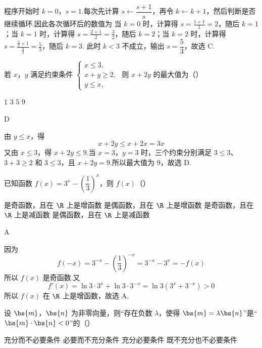 \begin{solution}
程序开始时 \(k=0\)，\(s=1\).每次先计算 \(s\leftarrow\dfrac{s+1}{s}\)，再令 \(k\leftarrow k+1\)，然后判断是否继续循环.因此各次循环后的数值为
当 \(k=0\) 时，计算得 \(s=\frac{1+1}{1}=2\)，随后 \(k=1\)；当 \(k=1\) 时，计算得 \(s=\frac{2+1}{2}=\frac32\)，随后 \(k=2\)；当 \(k=2\) 时，计算得 \(s=\frac{\frac32+1}{\frac32}=\frac53\)，随后 \(k=3\).
此时 \(k<3\) 不成立，输出 \(s=\dfrac53\)，故选 C.
\end{solution}

\begin{problem}
若 \(x\)，\(y\) 满足约束条件 \(\begin{cases}
x\le 3,\\
x+y\ge 2,\\
y\le x,
\end{cases}\) 则 \(x+2y\) 的最大值为（\quad）

\choices
    {\(1\)}
    {\(3\)}
    {\(5\)}
    {\(9\)}
\end{problem}

\begin{answer}
D
\end{answer}

\begin{solution}
由 \(y\le x\)，得
\[
x+2y\le x+2x=3x
\]
又由 \(x\le3\)，得 \(x+2y\le9\).当 \(x=3\)，\(y=3\) 时，三个约束分别满足 \(3\le3\)、\(3+3\ge2\) 和 \(3\le3\)，且 \(x+2y=9\).所以最大值为 \(9\)，故选 D.
\end{solution}

\begin{problem}
已知函数 \(f(x)=3^x-\left(\dfrac13\right)^x\)，则 \(f(x)\)（\quad）

\choices
    {是奇函数，且在 \(\R\) 上是增函数}
    {是偶函数，且在 \(\R\) 上是增函数}
    {是奇函数，且在 \(\R\) 上是减函数}
    {是偶函数，且在 \(\R\) 上是减函数}
\end{problem}

\begin{answer}
A
\end{answer}

\begin{solution}
因为
\[
f(-x)=3^{-x}-\left(\frac13\right)^{-x}=3^{-x}-3^x=-f(x)
\]
所以 \(f(x)\) 是奇函数.又
\[
f'(x)=\ln3\cdot3^x+\ln3\cdot3^{-x}=\ln3\left(3^x+3^{-x}\right)>0
\]
所以 \(f(x)\) 在 \(\R\) 上是增函数，故选 A.
\end{solution}

\begin{problem}
设 \(\bs{m}\)，\(\bs{n}\) 为非零向量，则“存在负数 \(\lambda\)，使得 \(\bs{m}=\lambda\bs{n}\)”是“\(\bs{m}\cdot \bs{n}<0\)”的（\quad）

\choices
    {充分而不必要条件}
    {必要而不充分条件}
    {充分必要条件}
    {既不充分也不必要条件}
\end{problem}

